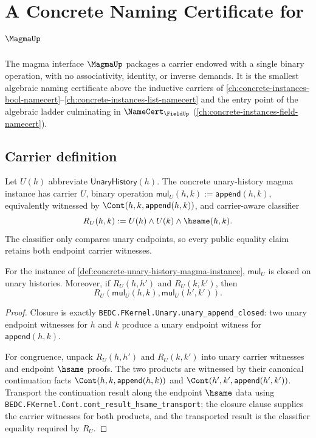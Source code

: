 \chapter{A Concrete Naming Certificate for $\MagmaUp$}
\label{ch:concrete-instances-magma-namecert}

The magma interface $\MagmaUp$ packages a carrier endowed with a single binary operation, with no associativity, identity, or inverse demands. It is the smallest algebraic naming certificate above the inductive carriers of \autoref{ch:concrete-instances-bool-namecert}--\autoref{ch:concrete-instances-list-namecert} and the entry point of the algebraic ladder culminating in $\NameCert_{\FieldUp}$ (\autoref{ch:concrete-instances-field-namecert}).

\section{Carrier definition}
\label{sec:magma-carrier}

\begin{definition}
\label{def:concrete-unary-history-magma-instance}
Let $U(h)$ abbreviate $\mathsf{UnaryHistory}(h)$. The concrete unary-history
magma instance has carrier $U$, binary operation
$\mathsf{mul}_U(h,k):=\mathsf{append}(h,k)$, equivalently witnessed by
$\Cont(h,k,\mathsf{append}(h,k))$, and carrier-aware classifier
$$
R_U(h,k):=U(h)\land U(k)\land\hsame(h,k).
$$
The classifier only compares unary endpoints, so every public equality claim
retains both endpoint carrier witnesses.
\end{definition}

\begin{theorem}
\label{thm:concrete-unary-history-magma-laws}
For the instance of \autoref{def:concrete-unary-history-magma-instance},
$\mathsf{mul}_U$ is closed on unary histories. Moreover, if $R_U(h,h')$ and
$R_U(k,k')$, then
$$
R_U(\mathsf{mul}_U(h,k),\mathsf{mul}_U(h',k')).
$$
\end{theorem}
\begin{proof}
Closure is exactly
\texttt{BEDC.FKernel.Unary.unary\_append\_closed}: two unary endpoint
witnesses for $h$ and $k$ produce a unary endpoint witness for
$\mathsf{append}(h,k)$.

For congruence, unpack $R_U(h,h')$ and $R_U(k,k')$ into unary carrier
witnesses and endpoint $\hsame$ proofs. The two products are witnessed by
their canonical continuation facts
$\Cont(h,k,\mathsf{append}(h,k))$ and
$\Cont(h',k',\mathsf{append}(h',k'))$. Transport the continuation result
along the endpoint $\hsame$ data using
\texttt{BEDC.FKernel.Cont.cont\_result\_hsame\_transport}; the closure clause
supplies the carrier witnesses for both products, and the transported result
is the classifier equality required by $R_U$.
\end{proof}

